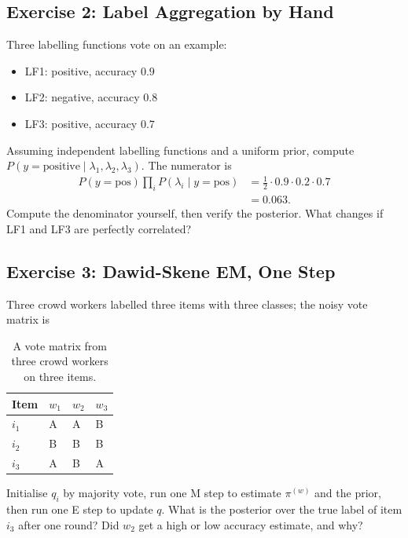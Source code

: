 \subsection{Exercise 2: Label Aggregation by Hand}

Three labelling functions vote on an example:
\begin{itemize}
    \item LF1: positive, accuracy $0.9$
    \item LF2: negative, accuracy $0.8$
    \item LF3: positive, accuracy $0.7$
\end{itemize}

 Assuming independent labelling functions and a uniform prior, compute $P(y = \text{positive} \mid \lambda_1, \lambda_2, \lambda_3)$. The numerator is
\begin{align*}
    P(y{=}\text{pos}) \prod_i P(\lambda_i \mid y{=}\text{pos})
        &= \tfrac{1}{2} \cdot 0.9 \cdot 0.2 \cdot 0.7 \\
        &= 0.063.
\end{align*}
Compute the denominator yourself, then verify the posterior. What changes if LF1 and LF3 are perfectly correlated?

\subsection{Exercise 3: Dawid-Skene EM, One Step}

Three crowd workers labelled three items with three classes; the noisy vote matrix is
\begin{table}[ht]
\centering
\begin{tabular}{p{}p{}p{}p{}}
    \toprule
    \textbf{Item} & \textbf{$w_1$} & \textbf{$w_2$} & \textbf{$w_3$} \\
    \midrule
    $i_1$ & A & A & B \\
    $i_2$ & B & B & B \\
    $i_3$ & A & B & A \\
    \bottomrule
\end{tabular}
\vspace{2em}
\caption{A vote matrix from three crowd workers on three items.}
\label{tab:ds_votes}
\end{table}

 Initialise $q_i$ by majority vote, run one M step to estimate $\pi^{(w)}$ and the prior, then run one E step to update $q$. What is the posterior over the true label of item $i_3$ after one round? Did $w_2$ get a high or low accuracy estimate, and why?

